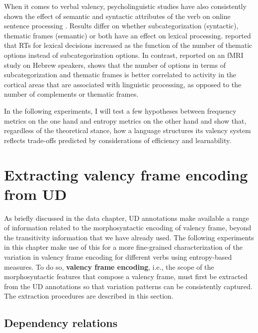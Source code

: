 When it comes to verbal valency, psycholinguistic studies have also consistently shown the effect of semantic and syntactic attributes of the verb on online sentence processing \citep{shapiro1987,collina2001}. Results differ on whether subcategorization (syntactic), thematic frames (semantic) or both have an effect on lexical processing. \citet{shapiro1987} reported that RTs for lexical decisions increased as the function of the number of thematic options instead of subcategorization options. In contrast, \citet{shetreet2007} reported on an fMRI study on Hebrew speakers, shows that the number of options in terms of subcategorization and thematic frames is better correlated to activity in the cortical areas that are associated with linguistic processing, as opposed to the number of complements or thematic frames.

In the following experiments, I will test a few hypotheses between frequency metrics on the one hand and entropy metrics on the other hand and show that, regardless of the theoretical stance, how a language structures its valency system reflects trade-offs predicted by considerations of efficiency and learnability.

\section{Extracting valency frame encoding from UD}\label{sec:valency-frame-encoding}

As briefly discussed in the data chapter, UD annotations make available a range of information related to the morphosyntactic encoding of valency frame, beyond the transitivity information that we have already used. The following experiments in this chapter make use of this for a more fine-grained characterization of the variation in valency frame encoding for different verbs using entropy-based measures. To do so, \textbf{valency frame encoding}, i.e., the scope of the morphosyntactic features that compose a valency frame, must first be extracted from the UD annotations so that variation patterns can be consistently captured. The extraction procedures are described in this section.
\subsection{Dependency relations}

